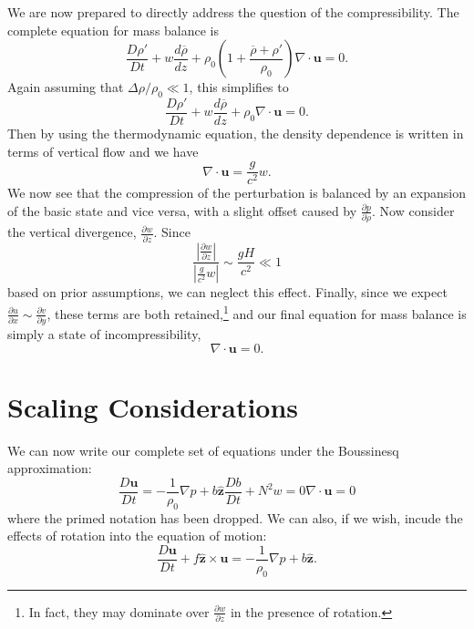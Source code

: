 \documentclass[letterpaper, 11pt]{article}
\newcommand{\pdiff}[2]{\frac{\partial #1}{\partial #2}}
\begin{document}
We are now prepared to directly address the question of the compressibility. The complete equation for mass balance is
\begin{equation}\label{ExactMassEqn}
\frac{D \rho'}{D t} + w \frac{d \overline{\rho}}{d z} + \rho_0 \left(1 + \frac{\overline{\rho} + \rho'}{\rho_0} \right) \nabla \cdot \bm{u} = 0.
\end{equation}
Again assuming that $\Delta \rho / \rho_0 \ll 1$, this simplifies to
\begin{equation*}
\frac{D \rho'}{D t} + w \frac{d \overline{\rho}}{d z} + \rho_0 \nabla \cdot \bm{u} = 0.
\end{equation*}
Then by using the thermodynamic equation, the density dependence is written in terms of vertical flow and we have
\begin{equation*}
\nabla \cdot \bm{u} = \frac{g}{c^2} w.
\end{equation*}
We now see that the compression of the perturbation is balanced by an expansion of the basic state and vice versa, with a slight offset caused by $\pdiff{p}{\rho}$. Now consider the vertical divergence, $\pdiff{w}{z}$. Since
\begin{equation*}
\frac{\left|\pdiff{w}{z}\right|}{\left|\frac{g}{c^2} w\right|} \sim \frac{g H}{c^2} \ll 1
\end{equation*}
based on prior assumptions, we can neglect this effect. Finally, since we expect $\pdiff{u}{x} \sim \pdiff{v}{y}$, these terms are both retained,\footnote{In fact, they may dominate over $\pdiff{w}{z}$ in the presence of rotation.} and our final equation for mass balance is simply a state of incompressibility,
\begin{equation}\label{BsqMassEqn}
\nabla \cdot \bm{u} = 0.
\end{equation}


\section{Scaling Considerations}

We can now write our complete set of equations under the Boussinesq approximation:
\begin{subequations}
\begin{equation}
\frac{D \bm{u}}{D t} = -\frac{1}{\rho_0} \nabla p + b \hat{\bm{z}}
\end{equation}
\begin{equation}
\frac{D b}{D t} + N^2 w = 0
\end{equation}
\begin{equation}
\nabla \cdot \bm{u} = 0
\end{equation}
\end{subequations}
where the primed notation has been dropped. We can also, if we wish, incude the effects of rotation into the equation of motion:
\begin{equation}
\frac{D \bm{u}}{D t} + f \hat{\bm{z}} \times \bm{u} = -\frac{1}{\rho_0} \nabla p + b \hat{\bm{z}}.
\end{equation}
\end{document}
